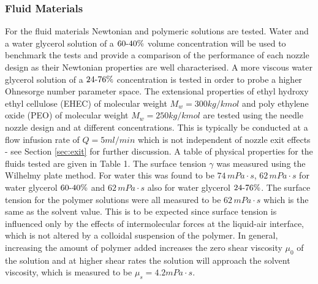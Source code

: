 \documentclass[11pt]{article}
\begin{document}
\subsubsection{Fluid Materials} \label{sec:materials}
For the fluid materials Newtonian and polymeric solutions are tested. Water and 
a water glycerol solution of a $60{\text -}40 \%$ volume concentration will be 
used to benchmark the tests and provide a comparison of the performance of each 
nozzle design as their Newtonian properties are well characterised. A more 
viscous water glycerol solution of a $24 {\text -} 76 \%$ concentration is 
tested in order to probe a higher Ohnesorge number parameter space. The 
extensional properties of ethyl hydroxy ethyl cellulose (EHEC) of molecular 
weight $M_w = 300 kg/kmol$ and poly ethylene oxide (PEO) of molecular weight 
$M_w = 250 kg/kmol$ are tested using the needle nozzle design and at different 
concentrations. This is typically be conducted at a flow infusion rate of 
$Q=5ml/min$ which is not independent of nozzle exit effects - see Section 
\ref{sec:exit} for further discussion. A table of physical properties for the 
fluids tested are given in Table 1. The surface tension $\gamma$ was measured 
using the Wilhelmy plate method. For water this was found to be $74 \, mPa \cdot 
s$, $62 \, mPa \cdot s$ for water glycerol $60 {\text -} 40\%$  and $62 \, mPa 
\cdot s$ also for water glycerol $24 {\text -} 76 \%$. The surface tension for 
the polymer solutions were all measured to be $62 \, mPa \cdot s$ which is the 
same as the solvent value. This is to be expected since surface tension is 
influenced only by the effects of intermolecular forces at the liquid-air 
interface, which is not altered by a colloidal suspension of the polymer. In 
general, increasing the amount of polymer added increases the zero shear 
viscosity $\mu_0$ of the solution and at higher shear rates the solution will 
approach the solvent viscosity, which is measured to be $\mu_{s} = 4.2 mPa \cdot 
s$.
\end{document}
